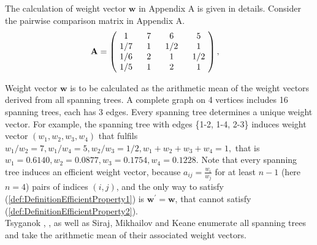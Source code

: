 \documentclass{article}
\theoremstyle{plain}
\begin{document}
The calculation of weight vector ${\mathbf{w}}$ in Appendix A is given in details.
Consider the pairwise comparison matrix in Appendix A.
\[
\mathbf{A} =
\begin{pmatrix}
$\,\,$   1  $\,\,$   & $\,\,$    7  $\,\,$   & $\,\,$    6   $\,\,$ & $\,\,$    5   $\,\,$     \\
$\,\,$  1/7 $\,\,$   & $\,\,$    1  $\,\,$   & $\,\,$   1/2  $\,\,$ & $\,\,$    1   $\,\,$     \\
$\,\,$  1/6 $\,\,$   & $\,\,$    2  $\,\,$   & $\,\,$    1   $\,\,$ & $\,\,$   1/2  $\,\,$     \\
$\,\,$  1/5 $\,\,$   & $\,\,$    1  $\,\,$   & $\,\,$    2   $\,\,$ & $\,\,$    1   $\,\,$
\end{pmatrix},
\quad
\]

Weight vector ${\mathbf{w}}$ is to be calculated as the arithmetic mean of the weight vectors
derived from all spanning trees.
A complete graph on 4 vertices includes 16 spanning trees, each has 3 edges.
Every spanning tree determines a unique weight vector. For example, the spanning tree with edges
\{1-2, 1-4, 2-3\} induces weight vector $(w_1 , w_2,  w_3, w_4)$ that fulf{\kern0pt}ils
$w_1/w_2 = 7, w_1/w_4 = 5, w_2/w_3 = 1/2, w_1+w_2+w_3+w_4=1,$ that is
$w_1=0.6140, w_2=0.0877, w_3=0.1754, w_4=0.1228.$
Note that every spanning tree induces an ef{\kern0pt}f{\kern0pt}icient weight vector,
because $a_{ij} = \frac{w_i}{w_j} $ for at least $n-1$ (here $n=4$) pairs of indices $(i,j)$, and the only
way to satisfy (\ref{def:DefinitionEfficientProperty1}) is $ \mathbf{w^{\prime}} = \mathbf{w}$,
that cannot satisfy (\ref{def:DefinitionEfficientProperty2}). \\

Tsyganok \cite{Tsyganok2000}, \cite[Section 3.5 Combinatorial method]{Tsyganok2010}, as well as
Siraj, Mikhailov and Keane \cite{SirajMikhailovKeane2012a,SirajMikhailovKeane2012b} enumerate all spanning trees
and take the arithmetic mean of their associated weight vectors.
\end{document}
